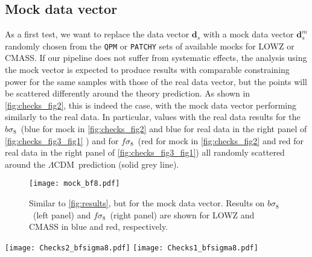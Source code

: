 \documentclass[astrosymb,twocolumn]{aastex631}
\newcommand{\bs}{\ensuremath{b\sigma_8}}
\renewcommand{\fs}{\ensuremath{f\!\sigma_8}}
\newcommand{\lcdm}{\(\Lambda\)CDM}
\begin{document}
\subsection{Mock data vector}
As a first test, we want to replace the data vector \(\bm d_s\) with a mock data vector \(\bm d_s^m\) randomly chosen from the \texttt{QPM} or \texttt{PATCHY} sets of available mocks for LOWZ or CMASS. If our pipeline does not suffer from systematic effects, the analysis using the mock vector is expected to produce results with comparable constraining power for the same samples with those of the real data vector, but the points will be scattered differently around the theory prediction. As shown in \autoref{fig:checks_fig2}, this is indeed the case, with the mock data vector performing similarly to the real data. 
In particular, values with the real data results for the \bs\ (blue for mock in \autoref{fig:checks_fig2} and blue for real data in the right panel of \autoref{fig:checks_fig3_fig1} ) and for \fs\ (red for mock in \autoref{fig:checks_fig2} and red for real data in the right panel of \autoref{fig:checks_fig3_fig1}) all randomly scattered around the \lcdm\ prediction (solid grey line).
\begin{figure}
\centering
\texttt{[image: mock\_bf8.pdf]}
\caption{Similar to \autoref{fig:results}, but for the mock data vector. Results on \bs\ (left panel) and \fs\ (right panel) are shown for LOWZ and CMASS in blue and red, respectively.}
\label{fig:checks_fig2}
\end{figure}

\begin{figure*}
\centering
\texttt{[image: Checks2\_bfsigma8.pdf]}
\texttt{[image: Checks1\_bfsigma8.pdf]}
\caption{\textit{Left:} Same as \autoref{fig:results}, but for the different fiducial cosmologies considered in \autoref{appendix}. We show the \(68\%\) C.L.\ intervals (error bars) and the means (circles) for \bs\ (top panel) and \fs\ (bottom panel) as a function of redshift for the bin choices of LOWZ and CMASS. Results for LOWZ with the original analysis assuming the Planck best-fit \lcdm\ cosmology, the Planck \lcdm\ cosmology at the 95\% C.L of the best-fit, the Planck best-fit \(w\)CDM cosmology and the WMAP7 \lcdm\ cosmology are respectively rendered in blue, cyan, green and brown, whilst for CMASS they are in red, gold, purple and pink. Again, the constraints on each redshift bin from the different tests are overplotted with \(0.003\) for clarity, and the solid grey curves are the \lcdm\ \citep{Ade2015}.\textit{Right}: In the same spirit as with the left panel but now for the cross-terms test that we have made (see \autoref{appendix}). Results for LOWZ with the original analysis and all the bin correlations (including all the cross-terms) respectively rendered in blue and cyan, whilst for CMASS they are in red and gold.}
\label{fig:checks_fig3_fig1}
\end{figure*}
\end{document}
